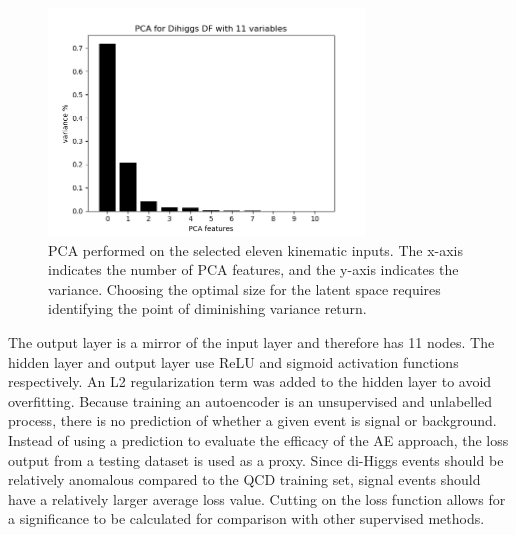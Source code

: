 \begin{figure}[!h] 
\begin{center}
\includegraphics*[width=0.75\textwidth] {AE/figures/ae_PCA_11vars}
\caption{PCA performed on the selected eleven kinematic inputs. The x-axis indicates the number of PCA features, and the y-axis indicates the variance. Choosing the optimal size for the latent space requires identifying the point of diminishing variance return.}
  \label{fig:ae_pca}
\end{center}
\end{figure}

The output layer is a mirror of the input layer and therefore has 11 nodes. The hidden layer and output layer use ReLU and sigmoid activation functions respectively. An L2 regularization term was added to the hidden layer to avoid overfitting. %
Because training an autoencoder is an unsupervised and unlabelled process, there is no prediction of whether a given event is signal or background. Instead of using a prediction to evaluate the efficacy of the AE approach, the loss output from a testing dataset is used as a proxy. Since di-Higgs events should be relatively anomalous compared to the QCD training set, signal events should have a relatively larger average loss value. Cutting on the loss function allows for a significance to be calculated for comparison with other supervised methods.

